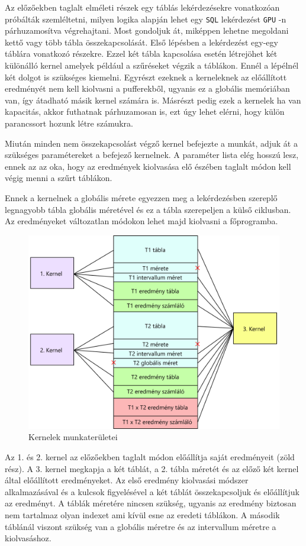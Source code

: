 Az előzőekben taglalt elméleti részek egy táblás lekérdezésekre vonatkozóan próbálták szemléltetni, milyen logika alapján lehet egy \texttt{SQL} lekérdezést \texttt{GPU} -n párhuzamosítva végrehajtani.
Most gondoljuk át, miképpen lehetne megoldani kettő vagy több tábla összekapcsolását. Első lépésben a lekérdezést egy-egy táblára vonatkozó részekre. Ezzel két tábla kapcsolása esetén létrejöhet két különálló kernel amelyek például a szűréseket végzik a táblákon. Ennél a lépélnél két dolgot is szükséges kiemelni. Egyrészt ezeknek a kerneleknek az előállított eredményét nem kell kiolvasni a pufferekből, ugyanis ez a globális memóriában van, így átadható másik kernel számára is. Másrészt pedig ezek a kernelek ha van kapacitás, akkor futhatnak párhuzamosan is, ezt úgy lehet elérni, hogy külön parancssort hozunk létre számukra.

Miután minden nem összekapcsolást végző kernel befejezte a munkát, adjuk át a szükséges paramétereket a befejező kernelnek. A paraméter lista elég hosszú lesz, ennek az az oka, hogy az eredmények kiolvasása elő észében taglalt módon kell végig menni a szűrt táblákon. 

Ennek a kernelnek a globális mérete egyezzen meg a lekérdezésben szereplő legnagyobb tábla globális méretével és ez a tábla szerepeljen a külső ciklusban. Az eredményeket változatlan módokon lehet majd kiolvasni a főprogramba.

\begin{figure}[h!]
\centering
\includegraphics[width=12cm]{images/join_kernels.png}
\caption{Kernelek munkaterületei }
\label{fig:opencl}
\end{figure}

Az 1. és 2. kernel az előzőekben taglalt módon előállítja saját eredményeit (zöld rész). 
A 3. kernel megkapja a két táblát, a 2. tábla méretét és az előző két kernel által előállított eredményeket.
Az első eredmény kiolvasási módszer alkalmazásával és a kulcsok figyelésével a két táblát összekapcsoljuk és előállítjuk az eredményt.
A táblák méretére nincsen szükség, ugyanis az eredmény biztosan nem tartalmaz olyan indexet ami kívül esne az eredeti táblákon. A második táblánál viszont szükség van a globális méretre és az intervallum méretre a kiolvasáshoz.


